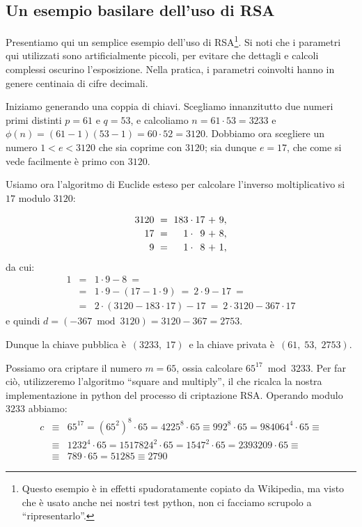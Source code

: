 \documentclass[pdflatex,11pt,a4paper,oneside]{article}
\newcommand{\p}[1]{\left({#1}\right)}
\newcommand{\ephi}[1]{\ensuremath{\phi\p{#1}}}
\newcommand{\congruent}[0]{\equiv}
\newcommand{\mmodop}[0]{\ensuremath{\operatorname{mod}}}
\newcommand{\rem}[2]{\ensuremath{{#1}\:\mmodop\:{#2}}}
\begin{document}
\subsection{Un esempio basilare dell'uso di RSA}

Presentiamo qui un semplice esempio dell'uso di RSA\footnote{Questo
esempio \`e in effetti spudoratamente copiato da Wikipedia, ma visto
che \`e usato anche nei nostri test python, non ci facciamo scrupolo
a ``ripresentarlo''.}. Si noti che i parametri qui utilizzati sono
artificialmente piccoli, per evitare che dettagli e calcoli complessi
oscurino l'esposizione. Nella pratica, i parametri coinvolti hanno
in genere centinaia di cifre decimali.

Iniziamo generando una coppia di chiavi. Scegliamo innanzitutto due numeri
primi distinti $p = 61$ e $q = 53$, e calcoliamo $n = 61 \cdot 53 = 3233$
e $\ephi{n} = (61 - 1)(53 - 1) = 60 \cdot 52 = 3120$. Dobbiamo ora
scegliere un numero $1 < e < 3120$ che sia coprime con $3120$; sia dunque
$e = 17$, che come si vede facilmente \`e primo con $3120$.

Usiamo ora l'algoritmo di Euclide esteso per calcolare l'inverso
moltiplicativo si $17$ modulo $3120$:

\begin{displaymath}
  \begin{array}{r@{\;~=\;~}r@{\:\cdot\:}r@{~+~}r}
  3120 & 183 & 17 & 9, \\[2pt]
    17 &   1 &  9 & 8, \\[2pt]
     9 &   1 &  8 & 1,
  \end{array}
\end{displaymath}
da cui:
\begin{eqnarray*}
    1 & = & 1 \cdot 9 - 8 ~= \\
      & = & 1 \cdot 9 - \p{ 17 - 1 \cdot 9 }
      ~ = ~ 2 \cdot 9 - 17 ~= \\
      & = & 2 \cdot \p{ 3120 - 183 \cdot 17 } - 17
      ~ = ~ 2 \cdot 3120 - 367 \cdot 17
\end{eqnarray*}
e quindi $d = \p{\rem{-367}{3120}} = 3120 - 367 = 2753$.

\medskip\noindent
Dunque la chiave pubblica \`e \,$(3233,\;17)$\, e la chiave privata
\`e \,$(61,\;53,\;2753)$.

\medskip
Possiamo ora criptare il numero $m = 65$, ossia calcolare
$\rem{{65}^{17}}{3233}$. Per far ci\`o, utilizzeremo l'algoritmo ``square
and multiply'', il che ricalca la nostra implementazione in python del
processo di criptazione RSA. Operando modulo $3233$ abbiamo:
\begin{eqnarray*}
c & \congruent\!\! &
    65^{17} = {\p{{65^2}}}^8 \cdot 65 = 4225^8 \cdot 65
    \congruent 992^8 \cdot 65 = 984064^4 \cdot 65 \congruent
  \\
  & \congruent\!\! &
    1232^4 \cdot 65 = 1517824^2 \cdot 65 = 1547^2 \cdot 65
    = 2393209 \cdot 65 \congruent
  \\
  & \congruent\!\! &
    789 \cdot 65 = 51285 \congruent 2790
\end{eqnarray*}
\end{document}
